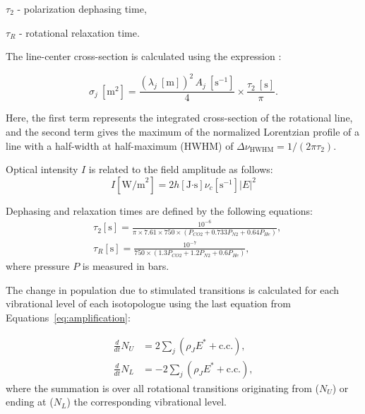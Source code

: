 $\tau_2$ - polarization dephasing time,

$\tau_R$ - rotational relaxation time.



The line-center cross-section is calculated using the expression \cite{Hilborn-2002}:

\begin{equation}\label{eq:sigma}
\sigma_j\ [\text{m}^2] = \frac{ (\lambda_j\ [\text{m}])^2\, A_j\ [\text{s}^{-1}] }{4} \times \frac{ \tau_2\ [\text{s}] }{ \pi }.
\end{equation}

Here, the first term represents the integrated cross-section of the rotational line, and the second term gives the maximum of the normalized Lorentzian profile of a line with a half-width at half-maximum (HWHM) of $\Delta \nu_{\text{HWHM}} = 1/(2\pi \tau_2)$.

Optical intensity $I$ is related to the field amplitude as follows:
\begin{equation}\label{eq:I}
I[\text{W/m}^2] = 2 h[\text{J·s}] \nu _c[\text{s}^{-1}] |E|^2
\end{equation}

Dephasing and relaxation times are defined by the following equations:
\begin{equation}\label{eq:relaxation}
\begin{aligned}
&\tau_2[\text{s}] = \frac{10^{- 6}}{\pi \times 7.61 \times 750 \times (P_{CO2}+0.733P_{N2}+0.64P_{He})},\\
&\tau _R[\text{s}] = \frac{10^{-7}}{750 \times (1.3P_{CO2}+1.2P_{N2}+0.6P_{He})},
\end{aligned}
\end{equation}
where pressure $P$ is measured in bars.


The change in population due to stimulated transitions is calculated for each vibrational level of each isotopologue using the last equation from Equations~\eqref{eq:amplification}:

\begin{equation}\label{eq:dNdt}
\begin{aligned}
\frac{d}{dt} N_U &= 2 \sum_{j} \left( \rho_J E^* + \text{c.c.} \right), \\
\frac{d}{dt} N_L &= -2 \sum_{j} \left( \rho_J E^* + \text{c.c.} \right),
\end{aligned}
\end{equation}
where the summation is over all rotational transitions originating from ($N_U$) or ending at ($N_L$) the corresponding vibrational level.

